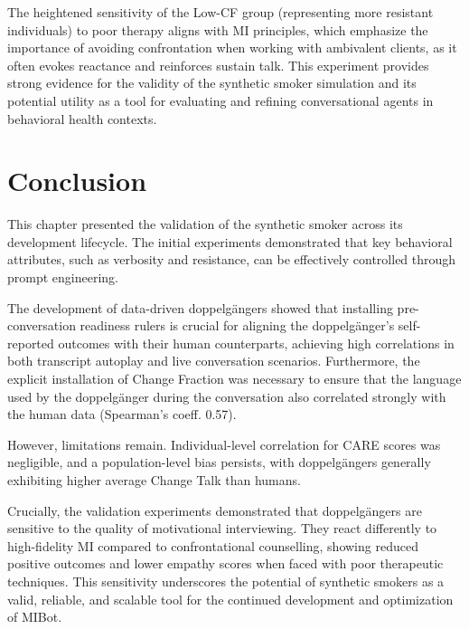 The heightened sensitivity of the Low-CF group (representing more resistant individuals) to poor therapy aligns with MI principles, which emphasize the importance of avoiding confrontation when working with ambivalent clients, as it often evokes reactance and reinforces sustain talk. This experiment provides strong evidence for the validity of the synthetic smoker simulation and its potential utility as a tool for evaluating and refining conversational agents in behavioral health contexts.

\section{Conclusion}

This chapter presented the validation of the synthetic smoker across its development lifecycle. The initial experiments demonstrated that key behavioral attributes, such as verbosity and resistance, can be effectively controlled through prompt engineering.

The development of data-driven doppelgängers showed that installing pre-conversation readiness rulers is crucial for aligning the doppelgänger's self-reported outcomes with their human counterparts, achieving high correlations in both transcript autoplay and live conversation scenarios. Furthermore, the explicit installation of Change Fraction was necessary to ensure that the language used by the doppelgänger during the conversation also correlated strongly with the human data (Spearman's coeff. 0.57).

However, limitations remain. Individual-level correlation for CARE scores was negligible, and a population-level bias persists, with doppelgängers generally exhibiting higher average Change Talk than humans.

Crucially, the validation experiments demonstrated that doppelgängers are sensitive to the quality of motivational interviewing. They react differently to high-fidelity MI compared to confrontational counselling, showing reduced positive outcomes and lower empathy scores when faced with poor therapeutic techniques. This sensitivity underscores the potential of synthetic smokers as a valid, reliable, and scalable tool for the continued development and optimization of MIBot.